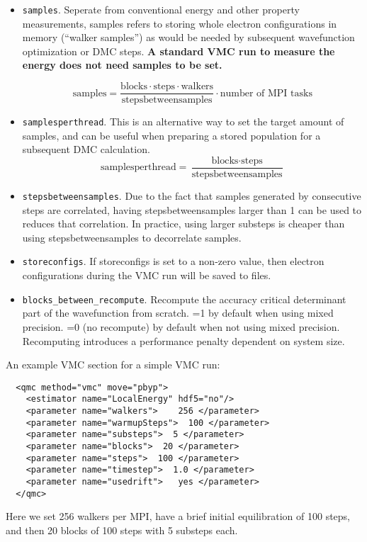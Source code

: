 \begin{itemize}
\item \texttt{samples}. Seperate from conventional energy and other
  property measurements, samples refers to storing whole electron
  configurations in memory (``walker samples'') as would be needed by subsequent
  wavefunction optimization or DMC steps. \textbf{A standard VMC run to
  measure the energy does not need samples to be set.}

\[
\textrm{samples}=
\frac{\textrm{blocks}\cdot\textrm{steps}\cdot\textrm{walkers}}{\textrm{stepsbetweensamples}}\cdot\textrm{number of MPI tasks}
\]

\item \texttt{samplesperthread}. This is an alternative way to set the target amount of samples, and can be useful when preparing a stored population for a subsequent DMC calculation.
\[
\textrm{samplesperthread}=
\frac{\textrm{blocks}\cdot\textrm{steps}}{\textrm{stepsbetweensamples}}
\]

\item \texttt{stepsbetweensamples}. Due to the fact that samples generated by consecutive steps are correlated, having stepsbetweensamples larger than 1 can be used to reduces that correlation. In practice, using larger substeps is cheaper than using stepsbetweensamples to decorrelate samples. 

\item \texttt{storeconfigs}. If storeconfigs is set to a non-zero value, then electron configurations during the VMC run will be saved to files.

\item \texttt{blocks\_between\_recompute}. Recompute the accuracy critical determinant part of the wavefunction
  from scratch. =1 by default when using mixed precision. =0 (no
  recompute) by default when not using mixed precision. Recomputing
  introduces a performance penalty dependent on system size.
\end{itemize}

An example VMC section for a simple VMC run:
\begin{lstlisting}
  <qmc method="vmc" move="pbyp">
    <estimator name="LocalEnergy" hdf5="no"/>
    <parameter name="walkers">    256 </parameter>
    <parameter name="warmupSteps">  100 </parameter>
    <parameter name="substeps">  5 </parameter>
    <parameter name="blocks">  20 </parameter>
    <parameter name="steps">  100 </parameter>
    <parameter name="timestep">  1.0 </parameter>
    <parameter name="usedrift">   yes </parameter>
  </qmc>
\end{lstlisting}
Here we set 256 walkers per MPI, have a brief initial equilibration of 100 steps, and then 20 blocks of 100 steps with 5 substeps each.

